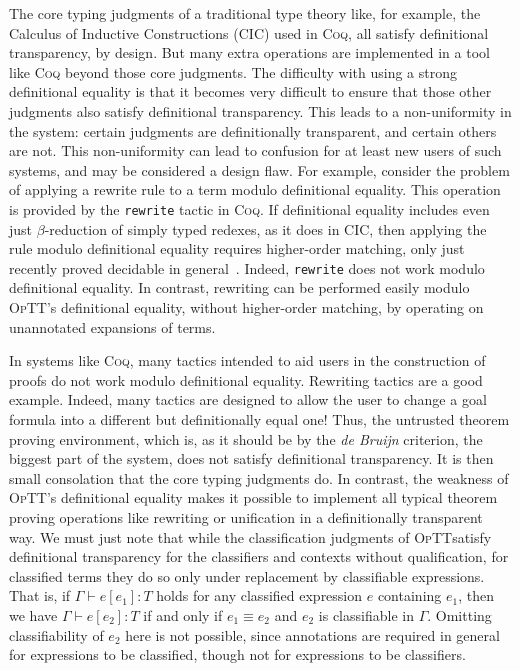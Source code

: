 \documentclass{fundam}
\newcommand{\seq}[3]{#1 \vdash #2 : #3}
\newcommand{\optt}{\textsc{OpTT}}
\begin{document}
The core typing judgments of a traditional type theory like, for
example, the Calculus of Inductive Constructions (CIC) used in
\textsc{Coq}, all satisfy definitional transparency, by design.  But
many extra operations are implemented in a tool like \textsc{Coq}
beyond those core judgments.  The difficulty with using a strong
definitional equality is that it becomes very difficult to ensure that
those other judgments also satisfy definitional transparency.  This
leads to a non-uniformity in the system: certain judgments are
definitionally transparent, and certain others are not.  This
non-uniformity can lead to confusion for at least new users of such
systems, and may be considered a design flaw.  For example, consider
the problem of applying a rewrite rule to a term modulo definitional
equality.  This operation is provided by the \texttt{rewrite} tactic
in \textsc{Coq}.  If definitional equality includes even just
$\beta$-reduction of simply typed redexes, as it does in CIC, then
applying the rule modulo definitional equality requires higher-order
matching, only just recently proved decidable in
general~\cite{stirling06}.  Indeed, \texttt{rewrite} does not work
modulo definitional equality.  In contrast, rewriting can be performed
easily modulo \optt's definitional equality, without higher-order
matching, by operating on unannotated expansions of terms.

In systems like \textsc{Coq}, many tactics intended to aid users in
the construction of proofs do not work modulo definitional equality.
Rewriting tactics are a good example.  Indeed, many tactics are
designed to allow the user to change a goal formula into a different
but definitionally equal one!  Thus, the untrusted theorem proving
environment, which is, as it should be by the \emph{de Bruijn}
criterion, the biggest part of the system, does not satisfy
definitional transparency.  It is then small consolation that the core
typing judgments do.  In contrast, the weakness of \optt's
definitional equality makes it possible to implement all typical
theorem proving operations like rewriting or unification in a
definitionally transparent way.  We must just note that while the
classification judgments of \optt satisfy definitional transparency
for the classifiers and contexts without qualification, for classified
terms they do so only under replacement by classifiable expressions.
That is, if $\seq{\Gamma}{e[e_1]}{T}$ holds for any classified
expression $e$ containing $e_1$, then we have
$\seq{\Gamma}{e[e_2]}{T}$ if and only if $e_1 \equiv e_2$ and $e_2$ is
classifiable in $\Gamma$.  Omitting classifiability of $e_2$ here is
not possible, since annotations are required in general for
expressions to be classified, though not for expressions to be
classifiers.
\end{document}
